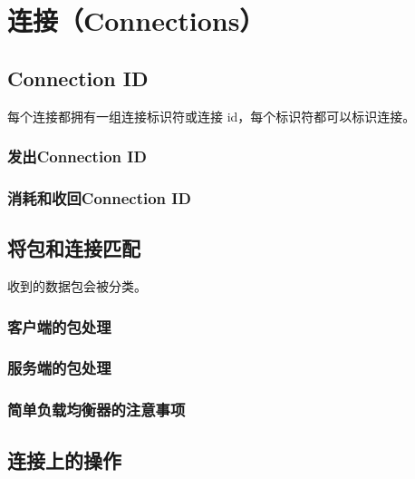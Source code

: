 \section{连接（Connections）}
\label{sec:connections}
\subsection{Connection ID}
每个连接都拥有一组连接标识符或连接 id，每个标识符都可以标识连接。

\subsubsection{发出Connection ID}
\subsubsection{消耗和收回Connection ID}

\subsection{将包和连接匹配}
\label{subsec:match-packet-connection}
收到的数据包会被分类。
\subsubsection{客户端的包处理}
\subsubsection{服务端的包处理}
\subsubsection{简单负载均衡器的注意事项}

\subsection{连接上的操作}